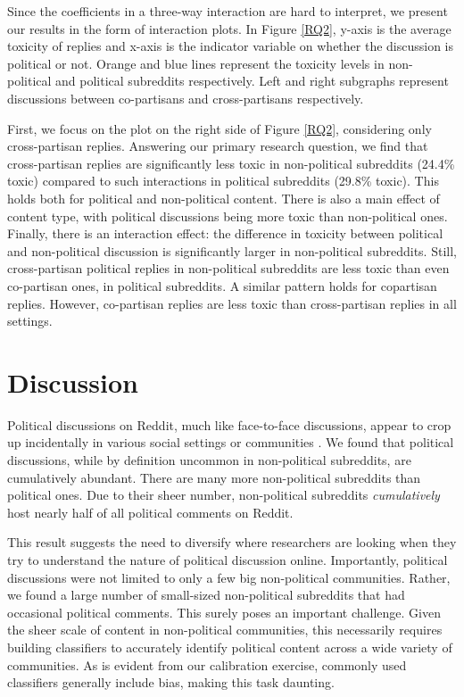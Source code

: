 \documentclass[letterpaper]{article} %
\begin{document}
Since the coefficients in a three-way interaction are hard to interpret, we present our results in the form of interaction plots. In Figure \ref{RQ2}, y-axis is the average toxicity of replies and x-axis is the indicator variable on whether the discussion is political or not. Orange and blue lines represent the toxicity levels in non-political and political subreddits respectively. Left and right subgraphs represent discussions between co-partisans and cross-partisans respectively.

First, we focus on the plot on the right side of Figure  \ref{RQ2}, considering only cross-partisan replies. Answering our primary research question, we find that cross-partisan replies are significantly less toxic in non-political subreddits (24.4\% toxic) compared to such interactions in political subreddits (29.8\% toxic).
This holds both for political and non-political content. There is also a main effect of content type, with political discussions being more toxic than non-political ones.
Finally, there is an interaction effect: the difference in toxicity between political and non-political discussion is significantly larger in non-political subreddits. Still, cross-partisan political replies in non-political subreddits are less toxic than even co-partisan ones, in political subreddits.
A similar pattern holds for copartisan replies. However, co-partisan replies are less toxic than cross-partisan replies in all settings.

\section{Discussion}



Political discussions on Reddit, much like face-to-face discussions, appear to crop up incidentally in various social settings or communities \cite{conover2018taking}. We found that political discussions, while by definition uncommon in non-political subreddits, are cumulatively abundant. There are many more non-political subreddits than political ones.
Due to their sheer number, non-political subreddits \textit{cumulatively} host nearly half of all political comments on Reddit.

This result suggests the need to diversify where researchers are looking when they try to understand the nature of political discussion online.
Importantly, political discussions were not limited to only a few big non-political communities. Rather, we found a large number of small-sized non-political subreddits that had occasional political comments.
This surely poses an important challenge. Given the sheer scale of content in non-political communities, this necessarily requires building classifiers to accurately identify political content across a wide variety of communities. As is evident from our calibration exercise, commonly used classifiers generally include bias, making this task daunting.
\end{document}
